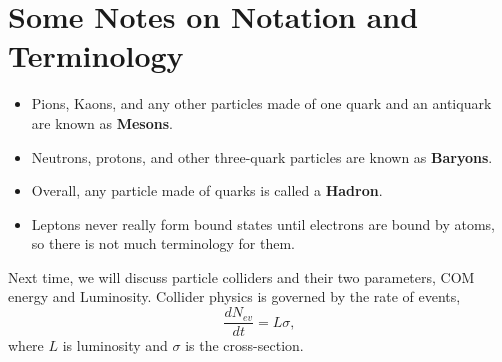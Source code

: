 \documentclass[a4paper, 11pt, normalem]{report}
\begin{document}
\section{Some Notes on Notation and Terminology}
\begin{itemize}
    \item Pions, Kaons, and any other particles made of one quark and an antiquark are known as \textbf{Mesons}.
    \item Neutrons, protons, and other three-quark particles are known as \textbf{Baryons}.
    \item Overall, any particle made of quarks is called a \textbf{Hadron}.
    \item Leptons never really form bound states until electrons are bound by atoms, so there is not much terminology for them.
\end{itemize}
Next time, we will discuss particle colliders and their two parameters, COM energy and Luminosity.
Collider physics is governed by the rate of events,
\begin{equation}
    \frac{dN_{ev}}{dt} = L\sigma,
\end{equation}
where $L$ is luminosity and $\sigma$ is the cross-section.
\end{document}

